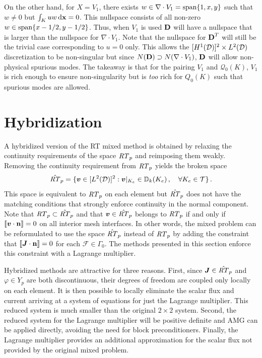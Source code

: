 \documentclass[../doc.tex]{subfiles}
\begin{document}
On the other hand, for $X=V_1$, there exists $w \in \nabla\cdot V_1 = \operatorname{span}\{1,x,y\}$ such that $w \neq 0$ but $\int_K uw \mathop{}\!\mathrm{d} \boldsymbol{\mathrm{x}} = 0$. This nullspace consists of all non-zero $w \in \operatorname{span}\{x-1/2,y-1/2\}$. Thus, when $V_1$ is used $\boldsymbol{\mathrm{D}}$ will have a nullspace that is larger than the nullspace for $\nabla\cdot V_1$. Note that the nullspace for $\boldsymbol{\mathrm{D}}^T$ will still be the trivial case corresponding to $u=0$ only. This allows the $[H^1(\mathcal{D})]^2\times L^2(\mathcal{D})$ discretization to be non-singular but since $N(\boldsymbol{\mathrm{D}}) \supset N(\nabla\cdot V_1)$, $\boldsymbol{\mathrm{D}}$ will allow non-physical spurious modes. 
The takeaway is that for the pairing $V_1$ and $\mathcal{Q}_0(K)$, $V_1$ is rich enough to ensure non-singularity but is \emph{too} rich for $Q_0(K)$ such that spurious modes are allowed. 

\section{Hybridization} \label{rtvef_sec:hyb}
A hybridized version of the RT mixed method is obtained by relaxing the continuity requirements of the space $\mathit{RT}_p$ and reimposing them weakly. Removing the continuity requirement from $\mathit{RT}_p$ yields the broken space 
	\begin{equation}
		\hat{\mathit{RT}}_p = \{ \boldsymbol{v} \in [L^2(\mathcal{D})]^2 : \boldsymbol{v}|_{K_e} \in \mathbb{D}_k(K_e) \,, \quad \forall K_e \in \mathcal{T} \} \,. 
	\end{equation}
This space is equivalent to $\mathit{RT}_p$ on each element but $\hat{\mathit{RT}}_p$ does not have the matching conditions that strongly enforce continuity in the normal component. Note that $\mathit{RT}_p \subset \hat{\mathit{RT}}_p$ and that $\boldsymbol{v} \in \hat{\mathit{RT}}_p$ belongs to $\mathit{RT}_p$ if and only if $\left\llbracket\boldsymbol{v}\cdot\boldsymbol{\mathrm{n}} \right\rrbracket = 0$ on all interior mesh interfaces. In other words, the mixed problem can be reformulated to use the space $\hat{\mathit{RT}}_p$ instead of $\mathit{RT}_p$ by adding the constraint that $\left\llbracket\boldsymbol{J}\cdot\boldsymbol{\mathrm{n}} \right\rrbracket = 0$ for each $\mathcal{F} \in \Gamma_0$. The methods presented in this section enforce this constraint with a Lagrange multiplier. 

Hybridized methods are attractive for three reasons. First, since $\boldsymbol{J}\in\hat{\mathit{RT}}_p$ and $\varphi \in Y_p$ are both discontinuous, their degrees of freedom are coupled only locally on each element. It is then possible to locally eliminate the scalar flux and current arriving at a system of equations for just the Lagrange multiplier. This reduced system is much smaller than the original $2\times 2$ system. Second, the reduced system for the Lagrange multiplier will be positive definite and AMG can be applied directly, avoiding the need for block preconditioners. Finally, the Lagrange multiplier provides an additional approximation for the scalar flux not provided by the original mixed problem. 
\end{document}
